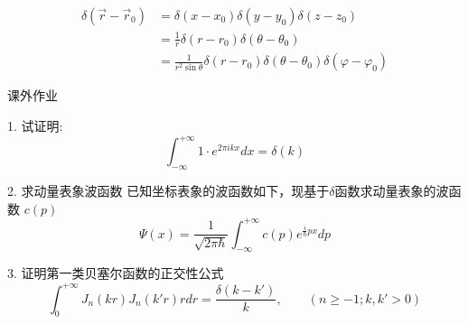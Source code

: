 	{}
	{}
	 \[
		\begin{aligned}
		  \delta (\vec{r}-\vec{r}_0) &=  \delta (x-x_0) \delta (y-y_0) \delta (z-z_0)\\
		  &=  \frac{1}{r}\delta (r-r_0) \delta (\theta -\theta_0) \\
		  &=  \frac{1}{r^2\sin\theta}\delta (r-r_0) \delta (\theta -\theta_0) \delta (\varphi -\varphi_0)
		\end{aligned}
		   \]



	{课外作业}
	 \begin{example}{1. 试证明:}
	 \[
	\int_{-\infty}^{+\infty} 1 \cdot e^{2\pi i kx} d x = \delta(k)
	\]
	 \end{example}
	\begin{example} {2. 求动量表象波函数}
	{已知坐标表象的波函数如下，现基于$\delta$函数求动量表象的波函数 $c(p)$}
		\begin{equation*}
			\Psi(x)=\frac{1}{\sqrt{2\pi \hbar}}  \int_{-\infty}^{+\infty} c(p) e^{\frac{i}{\hbar} px} dp 
		\end{equation*}   	
	\end{example}
\begin{example} {3. 证明第一类贝塞尔函数的正交性公式}
	\[\int_{0}^{+\infty} J_n(kr)J_n(k'r) r dr = \frac{\delta(k-k')}{k}, \qquad (n\geq-1; k, k'>0)\] 
	\end{example}

